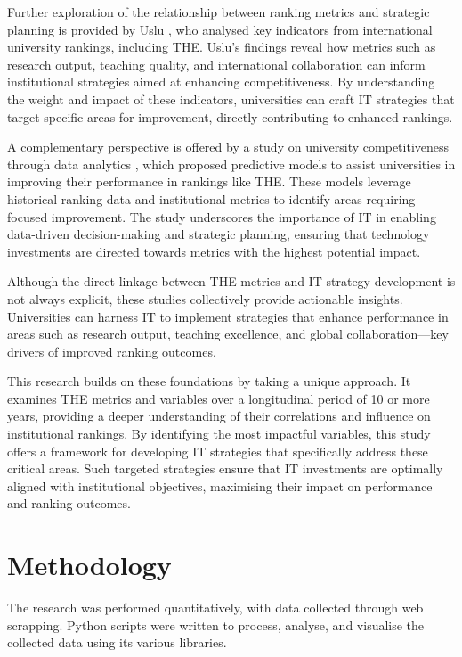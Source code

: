 \documentclass[conference]{IEEEtran}
\begin{document}
Further exploration of the relationship between ranking metrics and strategic planning is provided by Uslu \cite{uslu2020university}, who analysed key indicators from international university rankings, including THE. Uslu's findings reveal how metrics such as research output, teaching quality, and international collaboration can inform institutional strategies aimed at enhancing competitiveness. By understanding the weight and impact of these indicators, universities can craft IT strategies that target specific areas for improvement, directly contributing to enhanced rankings.

A complementary perspective is offered by a study on university competitiveness through data analytics \cite{analytics2022competitiveness}, which proposed predictive models to assist universities in improving their performance in rankings like THE. These models leverage historical ranking data and institutional metrics to identify areas requiring focused improvement. The study underscores the importance of IT in enabling data-driven decision-making and strategic planning, ensuring that technology investments are directed towards metrics with the highest potential impact.

Although the direct linkage between THE metrics and IT strategy development is not always explicit, these studies collectively provide actionable insights. Universities can harness IT to implement strategies that enhance performance in areas such as research output, teaching excellence, and global collaboration—key drivers of improved ranking outcomes.

This research builds on these foundations by taking a unique approach. It examines THE metrics and variables over a longitudinal period of 10 or more years, providing a deeper understanding of their correlations and influence on institutional rankings. By identifying the most impactful variables, this study offers a framework for developing IT strategies that specifically address these critical areas. Such targeted strategies ensure that IT investments are optimally aligned with institutional objectives, maximising their impact on performance and ranking outcomes.


\section{Methodology}
\label{sec:methodology}

The research was performed quantitatively, with data collected through web scrapping. Python scripts were written to process, analyse, and visualise the collected data using its various libraries. 
\end{document}
